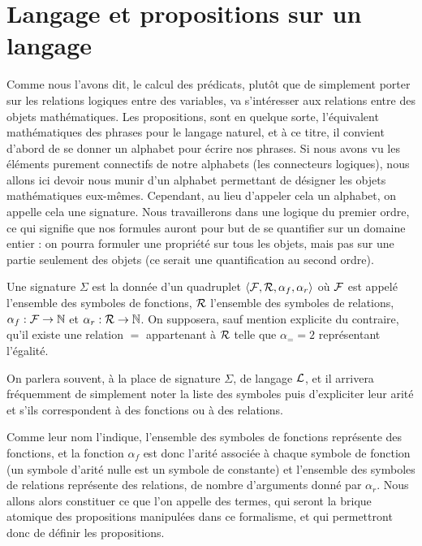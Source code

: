 \section{Langage et propositions sur un langage}

Comme nous l'avons dit, le calcul des prédicats, plutôt que de simplement porter sur les relations logiques entre des variables, va s'intéresser aux relations entre des objets mathématiques. Les propositions, sont en quelque sorte, l'équivalent mathématiques des phrases pour le langage naturel, et à ce titre, il convient d'abord de se donner un alphabet pour écrire nos phrases. Si nous avons vu les éléments purement connectifs de notre alphabets (les connecteurs logiques), nous allons ici devoir nous munir d'un alphabet permettant de désigner les objets mathématiques eux-mêmes. Cependant, au lieu d'appeler cela un alphabet, on appelle cela une signature. Nous travaillerons dans une logique du premier ordre, ce qui signifie que nos formules auront pour but de se quantifier sur un domaine entier : on pourra formuler une propriété sur tous les objets, mais pas sur une partie seulement des objets (ce serait une quantification au second ordre).

\begin{defi}[Signature]
    Une signature $\Sigma$ est la donnée d'un quadruplet $\langle \mathcal F,\mathcal R,\alpha_f,\alpha_r\rangle$ où $\mathcal F$ est appelé l'ensemble des symboles de fonctions, $\mathcal R$ l'ensemble des symboles de relations, $\alpha_f : \mathcal F \to \mathbb{N}$ et $\alpha_r : \mathcal R \to \mathbb{N}$. On supposera, sauf mention explicite du contraire, qu'il existe une relation $=$ appartenant à $\mathcal R$ telle que $\alpha_= = 2$ représentant l'égalité.
\end{defi}

\begin{rmk}
    On parlera souvent, à la place de signature $\Sigma$, de langage $\mathcal L$, et il arrivera fréquemment de simplement noter la liste des symboles puis d'expliciter leur arité et s'ils correspondent à des fonctions ou à des relations.
\end{rmk}

Comme leur nom l'indique, l'ensemble des symboles de fonctions représente des fonctions, et la fonction $\alpha_f$ est donc l'arité associée à chaque symbole de fonction (un symbole d'arité nulle est un symbole de constante) et l'ensemble des symboles de relations représente des relations, de nombre d'arguments donné par $\alpha_r$. Nous allons alors constituer ce que l'on appelle des termes, qui seront la brique atomique des propositions manipulées dans ce formalisme, et qui permettront donc de définir les propositions.

